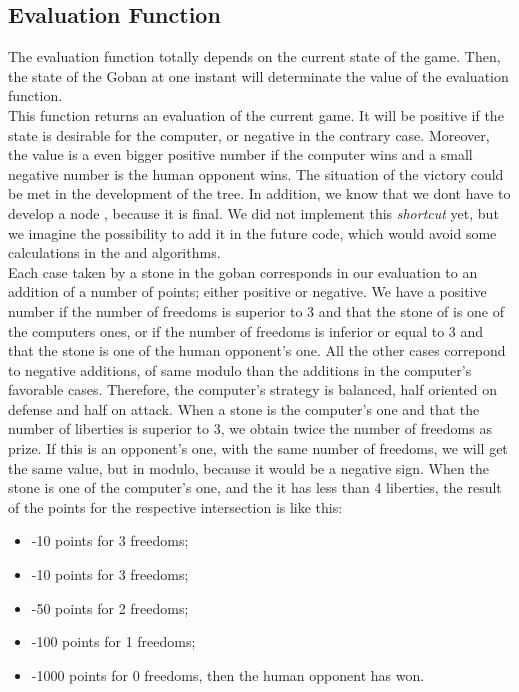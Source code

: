 \documentclass[a4paper,10pt]{report}
\newcommand{\empha}[1]{\textbf{\color{blue}{#1}}}
\begin{document}
			\subsection{Evaluation Function}
The evaluation function totally depends on the current state of the game. Then, the state of the Goban at one instant will determinate the value of the evaluation function.
\\
This function returns an evaluation of the current game. It will be positive if the state is desirable for the computer, or negative in the contrary case. Moreover, the value is a even bigger positive number if the computer wins and a small negative number is the human opponent wins. The situation of the victory could be met in the development of the tree. In addition, we know that we dont have to develop a node \empha{victory node}, because it is final. We did not implement this \textsl{shortcut} yet, but we imagine the possibility to add it in the future code, which would avoid some calculations in the  \empha{Min-Max}  and \empha{Alpha-Beta} algorithms.
\\
Each case taken by a stone in the goban corresponds in our evaluation to an addition of a number of points; either positive or negative. We have a positive number if the number of freedoms is superior to 3 and that the stone of is one of the computers ones, or if the number of freedoms is inferior or equal to 3 and that the stone is one of the human opponent's one. All the other cases correpond to negative additions, of same modulo than the additions in the computer's favorable cases. Therefore, the computer's strategy is balanced, half oriented on defense and half on attack. When a stone is the computer's one and that the number of liberties is superior to 3, we obtain twice the number of freedoms as prize. If this is an opponent's one, with the same number of freedoms, we will get the same value, but in modulo, because it would be a negative sign. When the stone is one of the computer's one, and the it has less than 4 liberties, the result of the points for the respective intersection is like this:
			\\
			\begin{itemize}
				\item -10 points for 3 freedoms; 
				\item -10 points for 3 freedoms;
				\item -50 points for 2 freedoms;
				\item -100 points for 1 freedoms;
				\item -1000 points for 0 freedoms, then the human opponent has won.
			\end{itemize}
\end{document}
